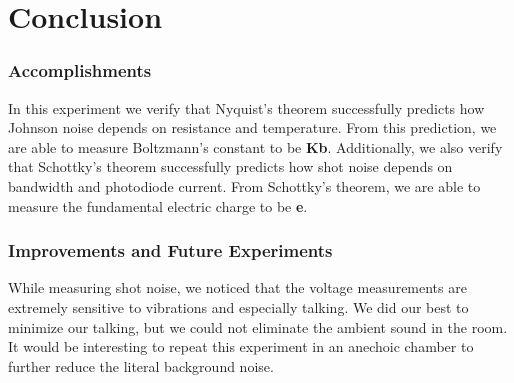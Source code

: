 \documentclass[12pt]{article}
\newcommand{\red}[1]{\textbf{\textcolor{myred1}{#1}}} %
\begin{document}
	\section{Conclusion}
	
	\subsubsection*{Accomplishments}
	In this experiment we verify that Nyquist's theorem successfully predicts how Johnson noise depends on resistance and temperature. From this prediction, we are able to measure Boltzmann's constant to be \red{Kb}. Additionally, we also verify that Schottky's theorem successfully predicts how shot noise depends on bandwidth and photodiode current. From Schottky's theorem, we are able to measure the fundamental electric charge to be \red{e}.
	
	\subsubsection*{Improvements and Future Experiments}
	While measuring shot noise, we noticed that the voltage measurements are extremely sensitive to vibrations and especially talking. We did our best to minimize our talking, but we could not eliminate the ambient sound in the room. It would be interesting to repeat this experiment in an anechoic chamber to further reduce the literal background noise. 
	
	
	\pagebreak
	
%
%	
%	
%	

	
\end{document}
